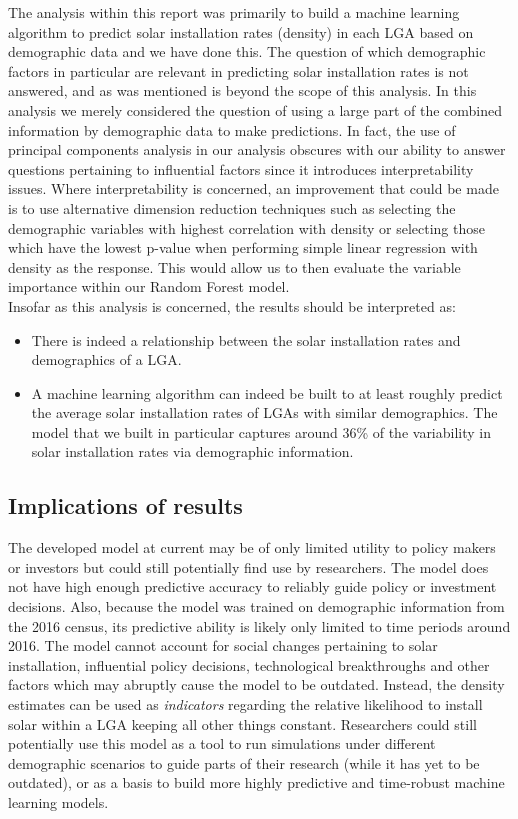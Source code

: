 \documentclass[a4paper]{article}
\begin{document}
The analysis within this report was primarily to build a machine learning algorithm to predict solar installation rates (density) in each LGA based on demographic data and we have done this. The question of which demographic factors in particular are relevant in predicting solar installation rates is not answered, and as was mentioned is beyond the scope of this analysis. In this analysis we merely considered the question of using a large part of the combined information by demographic data to make predictions. In fact, the use of principal components analysis in our analysis obscures with our ability to answer questions pertaining to influential factors since it introduces interpretability issues. Where interpretability is concerned, an improvement that could be made is to use alternative dimension reduction techniques such as selecting the demographic variables with highest correlation with density or selecting those which have the lowest p-value when performing simple linear regression with density as the response. This would allow us to then evaluate the variable importance within our Random Forest model. \\

Insofar as this analysis is concerned, the results should be interpreted as:

\begin{itemize}
\item There is indeed a relationship between the solar installation rates and demographics of a LGA.
\item A machine learning algorithm can indeed be built to at least roughly predict the average solar installation rates of LGAs with similar demographics. The model that we built in particular captures around 36\% of the variability in solar installation rates via demographic information.
\end{itemize}

\subsection{Implications of results}

The developed model at current may be of only limited utility to policy makers or investors but could still potentially find use by researchers. The model does not have high enough predictive accuracy to reliably guide policy or investment decisions. Also, because the model was trained on demographic information from the 2016 census, its predictive ability is likely only limited to time periods around 2016. The model cannot account for social changes pertaining to solar installation, influential policy decisions, technological breakthroughs and other factors which may abruptly cause the model to be outdated. Instead, the density estimates can be used as \textit{indicators} regarding the relative likelihood to install solar within a LGA keeping all other things constant. Researchers could still potentially use this model as a tool to run simulations under different demographic scenarios to guide parts of their research (while it has yet to be outdated), or as a basis to build more highly predictive and time-robust machine learning models.
\end{document}
